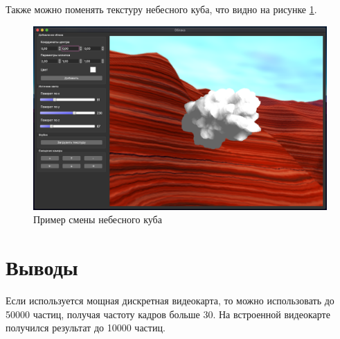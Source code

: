 Также можно поменять текстуру небесного куба, что видно на рисунке \ref{img:example3}.

\begin{figure}[H]
    \centering
    \includegraphics[scale=0.3]{img/example3.png}
    \caption{Пример смены небесного куба}
    \label{img:example3}
\end{figure}

\section{Выводы}

Если используется мощная дискретная видеокарта, то можно использовать до 50000 частиц, получая
частоту кадров больше 30. На встроенной видеокарте получился результат до 10000 частиц.
